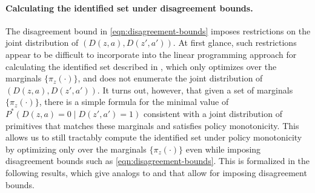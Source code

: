 \documentclass[12pt]{article}%
\theoremstyle{definition}
\newcommand\1{\operatorname{I}\indicatorfence}
\begin{document}
\paragraph{Calculating the identified set under disagreement bounds.} The
disagreement bound in \cref{eqn:disagreement-bounds} imposes restrictions on the
joint distribution of $(D(z, a), D(z', a'))$. At first glance, such restrictions
appear to be difficult to incorporate into the linear programming approach for
calculating the identified set described in , which
only optimizes over the marginals $\{\pi_{z}(\cdot)\}$, and does not enumerate
the joint distribution of $(D(z, a), D(z', a'))$. It turns out, however, that given a set of marginals $\{\pi_{z}(\cdot)\}$, there is a
simple formula for the minimal value of $P^{*}(D(z, a)=0 \mid D(z', a')=1)$
consistent with a joint distribution of primitives that matches these marginals
and satisfies policy monotonicity. This allows us to still tractably compute the
identified set under policy monotonicity by optimizing only over the marginals $\{\pi_{z}(\cdot)\}$ even
while imposing disagreement bounds such as \cref{eqn:disagreement-bounds}. This
is formalized in the following results, which give analogs to
 and  that allow for
imposing disagreement bounds.
\end{document}
